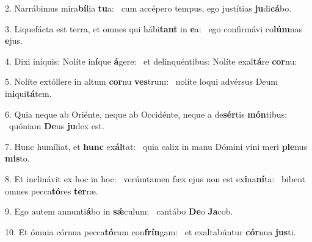 2. Narrábimus mira\textbf{bí}lia \textbf{tu}a: \ast\  cum accépero tempus, ego justítias \textbf{ju}di\textbf{cá}bo.\

3. Liquefácta est terra, et omnes qui hábi\textbf{tant} in \textbf{e}a: \ast\  ego confirmávi co\textbf{lúm}nas \textbf{e}jus.\

4. Dixi iníquis: Nolíte in\textbf{í}que \textbf{á}gere: \ast\  et delinquéntibus: Nolíte exal\textbf{tá}re \textbf{cor}nu:\

5. Nolíte extóllere in altum \textbf{cor}nu \textbf{ves}trum: \ast\  nolíte loqui advérsus Deum in\textbf{i}qui\textbf{tá}tem.\

6. Quia neque ab Oriénte, neque ab Occidénte, neque a de\textbf{sér}tis \textbf{món}tibus: \ast\  quóniam \textbf{De}us \textbf{ju}dex est.\

7. Hunc humíliat, et \textbf{hunc} ex\textbf{ál}tat: \ast\  quia calix in manu Dómini vini meri \textbf{ple}nus \textbf{mis}to.\

8. Et inclinávit ex hoc in hoc: \dag\  verúmtamen fæx ejus non est ex\textbf{i}na\textbf{ní}ta: \ast\  bibent omnes pecca\textbf{tó}res \textbf{ter}ræ.\

9. Ego autem annunti\textbf{á}bo in \textbf{sǽ}culum: \ast\  cantábo \textbf{De}o \textbf{Ja}cob.\

10. Et ómnia córnua pecca\textbf{tó}rum con\textbf{frín}gam: \ast\  et exaltabúntur \textbf{cór}nua \textbf{jus}ti.\

